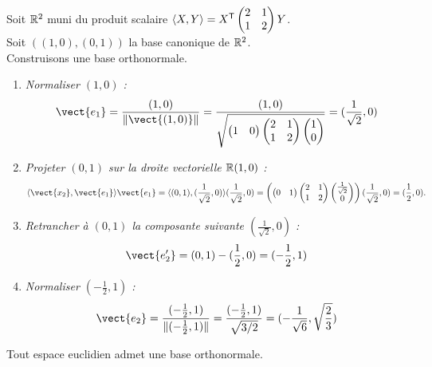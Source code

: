 \documentclass{book}
\begin{document}
\begin{Exemple}
Soit $\mathbb{R}^2$ muni du produit scalaire  $\langle X,Y\rangle=X^{\mathsf {T}}\begin{pmatrix}
2&1 \\1&2
\end{pmatrix}Y$.\\
Soit $((1,0),(0,1))$ la base canonique de $\mathbb{R}^2$.\\
Construisons une base orthonormale.
\begin{enumerate}
\item \textit{Normaliser $(1,0)$ : } $$\vect{e_1}=\frac{(1,0)}{\norme{\vect{(1,0)}}}=\frac{(1,0)}{\sqrt{\begin{pmatrix}
1 &0
\end{pmatrix}\begin{pmatrix}
2&1 \\1&2
\end{pmatrix}\begin{pmatrix}
1 \\0
\end{pmatrix}}}=(\frac{1}{\sqrt{2}},0)$$
\item \textit{Projeter $(0,1)$ sur la droite vectorielle  $\mathbb{R} (1,0)$ : }$$\PS{\vect{x_2}}{\vect{e_1}}\vect{e_1}=\PS{(0,1)}{(\frac{1}{\sqrt{2}},0)}(\frac{1}{\sqrt{2}},0)=\left(\begin{pmatrix}
0 &1
\end{pmatrix}\begin{pmatrix}
2&1 \\1&2
\end{pmatrix}\begin{pmatrix}
\frac{1}{\sqrt{2}} \\0
\end{pmatrix}\right)(\frac{1}{\sqrt{2}},0) = (\frac{1}{2},0).  $$
\item \textit{Retrancher à $(0,1)$ la composante suivante $(\frac{1}{\sqrt{2}},0)$  : } $$\vect{e'_2}= (0,1) - (\frac{1}{2},0)=(-\frac{1}{2},1)$$
\item \textit{Normaliser $(-\frac{1}{2},1)$ : } $$\vect{e_2}=\frac{(-\frac{1}{2},1)}{\norme{(-\frac{1}{2},1)}}= \frac{(-\frac{1}{2},1)}{\sqrt{3/2}}=(-\frac{1}{\sqrt{6}},\sqrt{\frac 2 3})$$
\end{enumerate}

\end{Exemple}
\begin{Theoreme}
Tout espace euclidien admet une base orthonormale.
\end{Theoreme}
\end{document}
